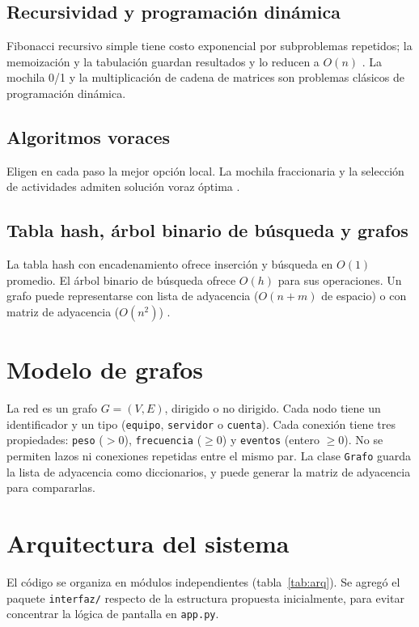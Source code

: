 \documentclass[12pt,a4paper]{article}
\begin{document}
\subsection{Recursividad y programación dinámica}
Fibonacci recursivo simple tiene costo exponencial por subproblemas repetidos; la memoización y la tabulación guardan resultados y lo reducen a $O(n)$ \cite{cormen2022}. La mochila 0/1 y la multiplicación de cadena de matrices son problemas clásicos de programación dinámica.

\subsection{Algoritmos voraces}
Eligen en cada paso la mejor opción local. La mochila fraccionaria y la selección de actividades admiten solución voraz óptima \cite{cormen2022}.

\subsection{Tabla hash, árbol binario de búsqueda y grafos}
La tabla hash con encadenamiento ofrece inserción y búsqueda en $O(1)$ promedio. El árbol binario de búsqueda ofrece $O(h)$ para sus operaciones. Un grafo puede representarse con lista de adyacencia ($O(n+m)$ de espacio) o con matriz de adyacencia ($O(n^2)$) \cite{cormen2022,sedgewick2011}.

\section{Modelo de grafos}
La red es un grafo $G=(V,E)$, dirigido o no dirigido. Cada nodo tiene un identificador y un tipo (\texttt{equipo}, \texttt{servidor} o \texttt{cuenta}). Cada conexión tiene tres propiedades: \texttt{peso} ($>0$), \texttt{frecuencia} ($\ge 0$) y \texttt{eventos} (entero $\ge 0$). No se permiten lazos ni conexiones repetidas entre el mismo par. La clase \texttt{Grafo} guarda la lista de adyacencia como diccionarios, y puede generar la matriz de adyacencia para compararlas.

\section{Arquitectura del sistema}
El código se organiza en módulos independientes (tabla~\ref{tab:arq}). Se agregó el paquete \texttt{interfaz/} respecto de la estructura propuesta inicialmente, para evitar concentrar la lógica de pantalla en \texttt{app.py}.
\end{document}

